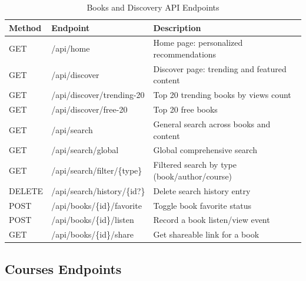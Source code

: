 \begin{table}[H]
\centering
\caption{Books and Discovery API Endpoints}
\begin{tabularx}{\textwidth}{|l|l|X|}
\hline
\textbf{Method} & \textbf{Endpoint} & \textbf{Description} \\
\hline
GET    & /api/home                    & Home page: personalized recommendations \\
\hline
GET    & /api/discover                & Discover page: trending and featured content \\
\hline
GET    & /api/discover/trending-20    & Top 20 trending books by views count \\
\hline
GET    & /api/discover/free-20        & Top 20 free books \\
\hline
GET    & /api/search                  & General search across books and content \\
\hline
GET    & /api/search/global           & Global comprehensive search \\
\hline
GET    & /api/search/filter/\{type\}  & Filtered search by type (book/author/course) \\
\hline
DELETE & /api/search/history/\{id?\}  & Delete search history entry \\
\hline
POST   & /api/books/\{id\}/favorite   & Toggle book favorite status \\
\hline
POST   & /api/books/\{id\}/listen     & Record a book listen/view event \\
\hline
GET    & /api/books/\{id\}/share      & Get shareable link for a book \\
\hline
\end{tabularx}
\end{table}

\subsection{Courses Endpoints}


